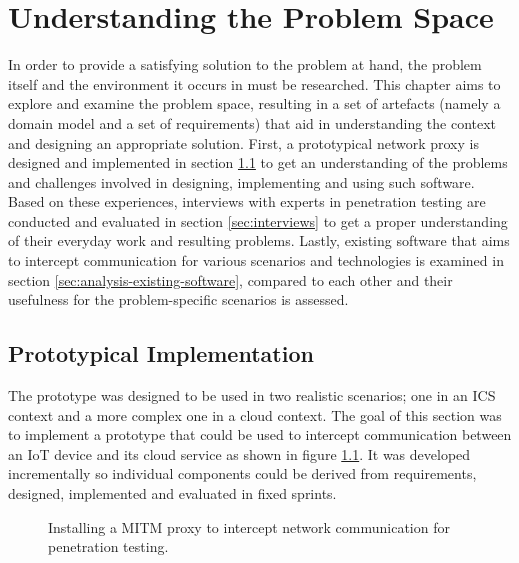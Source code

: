 \chapter{Understanding the Problem Space}
\label{chap:understanding-the-problem-space}
In order to provide a satisfying solution to the problem at hand, the problem itself and the environment it occurs in must be researched. This chapter aims to explore and examine the problem space, resulting in a set of artefacts (namely a domain model and a set of requirements) that aid in understanding the context and designing an appropriate solution. First, a prototypical network proxy is designed and implemented in section \ref{sec:prototypical-implementation} to get an understanding of the problems and challenges involved in designing, implementing and using such software. Based on these experiences, interviews with experts in penetration testing are conducted and evaluated in section \ref{sec:interviews} to get a proper understanding of their everyday work and resulting problems. Lastly, existing software that aims to intercept communication for various scenarios and technologies is examined in section \ref{sec:analysis-existing-software}, compared to each other and their usefulness for the problem-specific scenarios is assessed.

\section{Prototypical Implementation}
\label{sec:prototypical-implementation}
The prototype was designed to be used in two realistic scenarios; one in an \ac{ICS} context and a more complex one in a cloud context. The goal of this section was to implement a prototype that could be used to intercept communication between an \ac{IoT} device and its cloud service as shown in figure \ref{fig:network-communication-diagrams}. It was developed incrementally so individual components could be derived from requirements, designed, implemented and evaluated in fixed sprints.

\begin{figure}%
    \centering
    \qquad
    \caption{Installing a \ac{MITM} proxy to intercept network communication for penetration testing.}%
    \label{fig:network-communication-diagrams}%
\end{figure}

